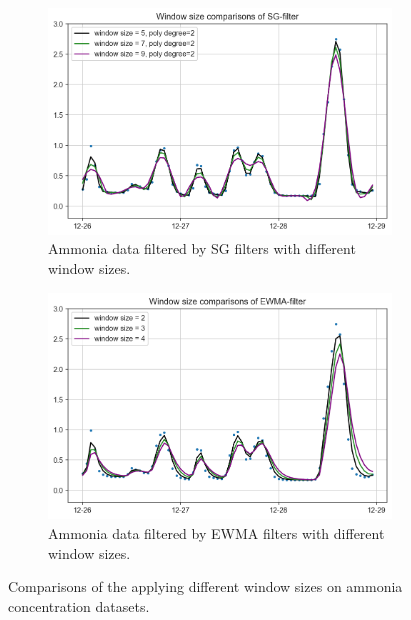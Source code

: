\begin{figure}[!ht]
    \centering
    \begin{subfigure}{0.7\textwidth}
      \includegraphics[width=\linewidth]{imgs/pre-processing/sg-filter.png}
      \caption{Ammonia data filtered by SG filters with different window sizes.} \label{fig:smoothed-sg}
    \end{subfigure}%
    \hspace{2em}%
    \begin{subfigure}{0.7\textwidth}
      \includegraphics[width=\linewidth]{imgs/pre-processing/ew-filter.png}
      \caption{Ammonia data filtered by EWMA filters with different window sizes.} \label{fig:smoothed-ew}
    \end{subfigure}%
  \caption{Comparisons of the applying different window sizes on ammonia concentration datasets.} \label{fig:smoothed}
\end{figure}

